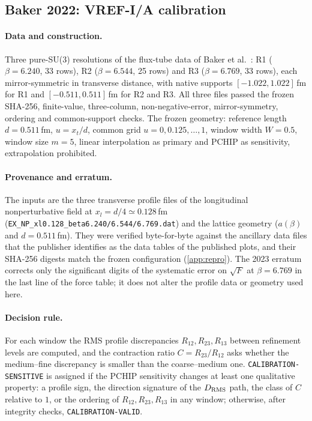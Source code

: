\documentclass[11pt,a4paper]{article}
\theoremstyle{definition}
\theoremstyle{remark}
\begin{document}
\subsection{Baker 2022: VREF-I/A calibration}\label{ssec:baker}
\paragraph{Data and construction.} Three pure-SU(3) resolutions of the flux-tube data of Baker et al.\ \cite{Baker22}: R1 ($\beta=6.240$, 33 rows), R2 ($\beta=6.544$, 25 rows) and R3 ($\beta=6.769$, 33 rows), each mirror-symmetric in transverse distance, with native supports $[-1.022,1.022]$\,fm for R1 and $[-0.511,0.511]$\,fm for R2 and R3. All three files passed the frozen SHA-256, finite-value, three-column, non-negative-error, mirror-symmetry, ordering and common-support checks. The frozen geometry: reference length $d=0.511$\,fm, $u=x_t/d$, common grid $u=0,0.125,\dots,1$, window width $W=0.5$, window size $m=5$, linear interpolation as primary and PCHIP as sensitivity, extrapolation prohibited.
\paragraph{Provenance and erratum.} The inputs are the three transverse profile files of the longitudinal nonperturbative field at $x_l=d/4\simeq0.128$\,fm (\texttt{EX\_NP\_xl0.128\_beta6.240/6.544/6.769.dat}) and the lattice geometry ($a(\beta)$ and $d=0.511$\,fm). They were verified byte-for-byte against the ancillary data files that the publisher identifies as the data tables of the published plots, and their SHA-256 digests match the frozen configuration (\cref{app:repro}). The 2023 erratum \cite{Baker22} corrects only the significant digits of the systematic error on $\sqrt F$ at $\beta=6.769$ in the last line of the force table; it does not alter the profile data or geometry used here.
\paragraph{Decision rule.} For each window the RMS profile discrepancies $R_{12},R_{23},R_{13}$ between refinement levels are computed, and the contraction ratio $C=R_{23}/R_{12}$ asks whether the medium--fine discrepancy is smaller than the coarse--medium one. \texttt{CALIBRATION-\allowbreak{}SENSITIVE} is assigned if the PCHIP sensitivity changes at least one qualitative property: a profile sign, the direction signature of the $D_{\rm RMS}$ path, the class of $C$ relative to $1$, or the ordering of $R_{12},R_{23},R_{13}$ in any window; otherwise, after integrity checks, \texttt{CALIBRATION-\allowbreak{}VALID}.
\end{document}
